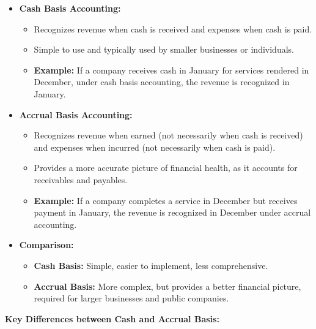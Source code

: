 \documentclass[12pt,a4paper]{book}
\begin{document}
\begin{itemize}
    \item \textbf{Cash Basis Accounting:}
    \begin{itemize}
        \item Recognizes revenue when cash is received and expenses when cash is paid.
        \item Simple to use and typically used by smaller businesses or individuals.
        \item \textbf{Example:} If a company receives cash in January for services rendered in December, under cash basis accounting, the revenue is recognized in January.
    \end{itemize}
    
    \item \textbf{Accrual Basis Accounting:}
    \begin{itemize}
        \item Recognizes revenue when earned (not necessarily when cash is received) and expenses when incurred (not necessarily when cash is paid).
        \item Provides a more accurate picture of financial health, as it accounts for receivables and payables.
        \item \textbf{Example:} If a company completes a service in December but receives payment in January, the revenue is recognized in December under accrual accounting.
    \end{itemize}
    
    \item \textbf{Comparison:}
    \begin{itemize}
        \item \textbf{Cash Basis:} Simple, easier to implement, less comprehensive.
        \item \textbf{Accrual Basis:} More complex, but provides a better financial picture, required for larger businesses and public companies.
    \end{itemize}
\end{itemize}

\vspace{0.5cm}
\textbf{Key Differences between Cash and Accrual Basis:}
\end{document}
